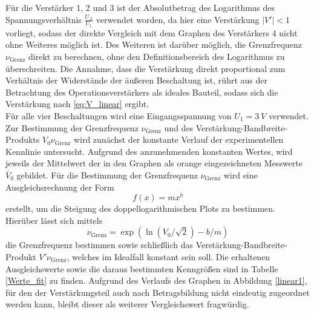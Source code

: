 Für die Verstärker 1, 2 und 3 ist der Absolutbetrag des Logarithmus des Spannungsverhältnis $\frac{U_A}{U_1}$ verwendet worden, da hier eine Verstärkung $|V'|<1$ vorliegt, sodass der direkte Vergleich mit dem Graphen des Verstärkers 4 nicht ohne Weiteres möglich ist. Des Weiteren ist darüber möglich, die Grenzfrequenz $\nu_\text{Grenz}$ direkt zu berechnen, ohne den Definitionsbereich des Logarithmus zu überschreiten.
Die Annahme, dass die Verstärkung direkt proportional zum Verhältnis der Widerstände der äußeren Beschaltung ist, rührt aus der Betrachtung des Operationsverstärkers als ideales Bauteil, sodass sich die Verstärkung nach \eqref{eq:V_linear} ergibt.\\
Für alle vier Beschaltungen wird eine Eingangsspannung von $U_1=\SI{3}{V}$ verwendet.
Zur Bestimmung der Grenzfrequenz $\nu_\text{Grenz}$ und des Verstärkung-Bandbreite-Produkts $V_0\nu_\text{Grenz}$ wird zunächst der konstante Verlauf der experimentellen Kennlinie untersucht. Aufgrund des anzunehmenden konstanten Wertes, wird jeweils der Mittelwert der in den Graphen als orange eingezeichneten Messwerte $\bar{V}_0$ gebildet.
Für die Bestimmung der Grenzfrequenz $\nu_\text{Grenz}$ wird eine Ausgleichsrechnung der Form
\begin{equation}
  f(x)=mx^b
\end{equation}
erstellt, um die Steigung des doppellogarithmischen Plots zu bestimmen.
Hierüber lässt sich mittels
\begin{equation}
  \nu_\text{Grenz}=\exp(\ln(V_0/\sqrt{2})-b/m)
\end{equation}
die Grenzfrequenz bestimmen sowie schließlich das Verstärkung-Bandbreite-Produkt $V'\nu_\text{Grenz}$, welches im Idealfall konstant sein soll. Die erhaltenen Ausgleichswerte sowie die daraus bestimmten Kenngrößen sind in Tabelle \ref{Werte_fit} zu finden. Aufgrund des Verlaufs des Graphen in Abbildung \ref{linear1}, für den der Verstärkungsteil auch nach Betragsbildung nicht eindeutig zugeordnet werden kann, bleibt dieser als weiterer Vergleichswert fragwürdig.

